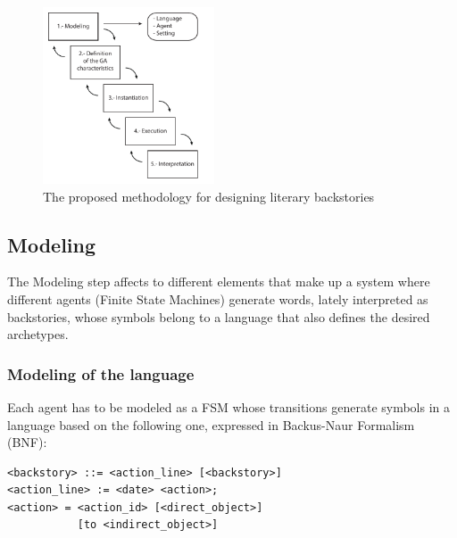 \documentclass{sig-alternate}
\begin{document}
\begin{figure}[htb]
\centering
   \includegraphics[width=12pc] {img/methodology.pdf}
\caption{The proposed methodology for designing literary backstories}
\label{fig:methodology}
\end{figure}


\subsection{Modeling}

The Modeling step affects to different elements that make up a system where different agents (Finite State Machines) generate words, lately interpreted as backstories, whose symbols belong to a language that also defines the desired archetypes.


\subsubsection{Modeling of the language}

Each agent has to be modeled as a FSM whose transitions generate symbols in a language based on the following one, expressed in Backus-Naur Formalism (BNF):

\begin{verbatim}
<backstory> ::= <action_line> [<backstory>]
<action_line> := <date> <action>;
<action> = <action_id> [<direct_object>]
           [to <indirect_object>]
\end{verbatim}
\end{document}
